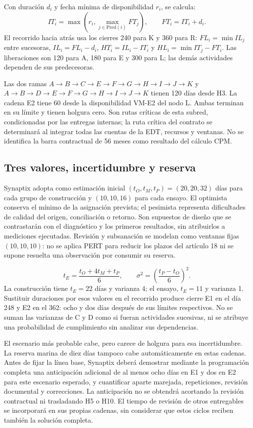 Con duración $d_i$ y fecha mínima de disponibilidad $r_i$, se calcula:
\[
 IT_i=\max\left(r_i,\max_{j\in\mathrm{Pred}(i)}FT_j\right),\qquad FT_i=IT_i+d_i.
\]
El recorrido hacia atrás usa los cierres 240 para K y 360 para R: $FL_i=\min IL_j$ entre sucesoras, $IL_i=FL_i-d_i$, $HT_i=IL_i-IT_i$ y $HL_i=\min IT_j-FT_i$. Las liberaciones son 120 para A, 180 para E y 300 para L; las demás actividades dependen de sus predecesoras.



Las dos ramas $A\to B\to C\to E\to F\to G\to H\to I\to J\to K$ y $A\to B\to D\to E\to F\to G\to H\to I\to J\to K$ tienen 120 días desde H3. La cadena E2 tiene 60 desde la disponibilidad VM-E2 del nodo L. Ambas terminan en su límite y tienen holgura cero. Son rutas críticas de esta subred, condicionadas por las entregas internas; la ruta crítica del contrato se determinará al integrar todas las cuentas de la EDT, recursos y ventanas. No se identifica la barra contractual de 56 meses como resultado del cálculo CPM.

\subsection{Tres valores, incertidumbre y reserva}
Synaptix adopta como estimación inicial $(t_O,t_M,t_P)=(20,20,32)$ días para cada grupo de construcción y $(10,10,16)$ para cada ensayo. El optimista conserva el mínimo de la asignación prevista; el pesimista representa dificultades de calidad del origen, conciliación o retorno. Son supuestos de diseño que se contrastarán con el diagnóstico y los primeros resultados, sin atribuirlos a mediciones ejecutadas. Revisión y subsanación se modelan como ventanas fijas $(10,10,10)$: no se aplica PERT para reducir los plazos del artículo 18 ni se supone resuelta una observación por consumir su reserva.

\[
 t_E=\frac{t_O+4t_M+t_P}{6},\qquad \sigma^2=\left(\frac{t_P-t_O}{6}\right)^2.
\]
La construcción tiene $t_E=22$ días y varianza 4; el ensayo, $t_E=11$ y varianza 1. Sustituir duraciones por esos valores en el recorrido produce cierre E1 en el día 248 y E2 en el 362: ocho y dos días después de sus límites respectivos. No se suman las varianzas de C y D como si fueran actividades sucesivas, ni se atribuye una probabilidad de cumplimiento sin analizar sus dependencias.

El escenario más probable cabe, pero carece de holgura para esa incertidumbre. La reserva marina de diez días tampoco cabe automáticamente en estas cadenas. Antes de fijar la línea base, Synaptix deberá demostrar mediante la programación completa una anticipación adicional de al menos ocho días en E1 y dos en E2 para este escenario esperado, y cuantificar aparte marejada, repeticiones, revisión documental y correcciones. La anticipación no se obtendrá acortando la revisión contractual ni trasladando H5 o H10. El tiempo de revisión de otros entregables se incorporará en sus propias cadenas, sin considerar que estos ciclos reciben también la solución completa.
